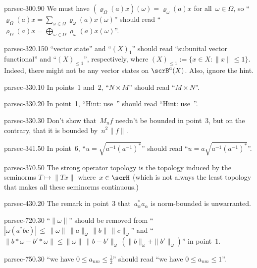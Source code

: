 \documentclass[b5page]{book}
\begin{document}
\begin{erratum}{parsec-300.90}
We must have $(\varrho_\Omega(a)x)(\omega)
= \varrho_\omega(a)x$
for all~$\omega\in\Omega$,
so
``$\varrho_\Omega(a)x = \sum_{\omega\in\Omega}
\varrho_\omega(a)x(\omega)$''
should read
``$\varrho_\Omega(a)x = \bigoplus_{\omega\in\Omega}
\varrho_\omega(a)x(\omega)$''.
\end{erratum}
\begin{erratum}{parsec-320.150}
``vector state'' and ``$(X)_1$''
should read ``subunital vector functional''
and ``$(X)_{\leq 1}$'', respectively,
where $(X)_{\leq 1} := 
\{x\in X\colon \|x\|\leq 1\}$.
Indeed, there might
not be any vector states on $\scrB^a(X)$.
Also, ignore the hint.
\end{erratum}
\begin{erratum}{parsec-330.10}
In points~1 and~2,
``$N\times M$'' should read
``$M\times N$''.
\end{erratum}
\begin{erratum}{parsec-330.20}
In point~1,
``Hint: use~'' should read
``Hint: use~''.
\end{erratum}
\begin{erratum}{parsec-330.30}
Don't show that~$M_nf$ needn't be bounded
in point~3,
but on the contrary, that it is bounded by~$n^2\|f\|$.
\end{erratum}
\begin{erratum}{parsec-341.50}
In point~6, ``$u=\sqrt{a^{-1}(a^{-1})^*}$''
should read ``$u=a\sqrt{a^{-1}(a^{-1})^*}$''.
\end{erratum}
\begin{erratum}{parsec-370.50}
The strong operator topology is the topology
induced by the seminorms $T\mapsto \|Tx\|$ where~$x\in \scrH$
(which is not always the least topology that makes
all these seminorms continuous.)
\end{erratum}
\begin{erratum}{parsec-430.20}
The remark in point~3 that~$a_\alpha^*a_\alpha$
is norm-bounded is unwarranted.
\end{erratum}
\begin{erratum}{parsec-720.30}
``$\|\omega\|$''
should be removed
from
``$\left|\omega(a^*bc)\right|\,\leq\,
\|\omega\|\,\|a\|_\omega\,\|b\|\,\|c\|_\omega$''
and 
``$\|b\ast \omega-b'\ast \omega\|
\leq \|\omega\|\,\|b-b'\|_\omega\,(\|b\|_\omega+\|b'\|_\omega)$''
in point~1.
\end{erratum}
\begin{erratum}{parsec-750.30}
``we have $0\leq a_{nm}\leq \frac{1}{2}$''
should read ``we have $0\leq a_{nm}\leq 1$''.
\end{erratum}
\end{document}
